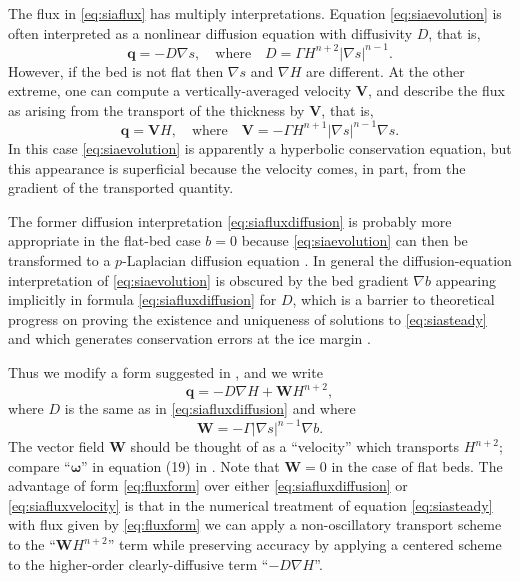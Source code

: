 \documentclass[twocolumn]{igs}
\newcommand\bq{\mathbf{q}}
\newcommand\bV{\mathbf{V}}
\newcommand\bW{\mathbf{W}}
\newcommand{\grad}{\nabla}
\begin{document}
The flux in \eqref{eq:siaflux} has multiply interpretations.  Equation \eqref{eq:siaevolution} is often interpreted as a nonlinear diffusion equation with diffusivity $D$, that is,
\begin{equation}
\bq = - D \grad s, \quad \text{where} \quad D =  \Gamma H^{n+2} |\grad s|^{n-1}. \label{eq:siafluxdiffusion}
\end{equation}
However, if the bed is not flat then $\grad s$ and $\grad H$ are different.  At the other extreme, one can compute a vertically-averaged velocity $\bV$, and describe the flux as arising from the transport of the thickness by $\bV$, that is,
\begin{equation}
\bq = \bV H, \quad \text{where} \quad \bV = - \Gamma H^{n+1} |\grad s|^{n-1} \grad s. \label{eq:siafluxvelocity}
\end{equation}
In this case \eqref{eq:siaevolution} is apparently a hyperbolic conservation equation, but this appearance is superficial because the velocity comes, in part, from the gradient of the transported quantity.

The former diffusion interpretation \eqref{eq:siafluxdiffusion} is probably more appropriate in the flat-bed case $b=0$ because \eqref{eq:siaevolution} can then be transformed to a $p$-Laplacian diffusion equation \cite{CDDSV}.  In general the diffusion-equation interpretation of \eqref{eq:siaevolution} is obscured by the bed gradient $\grad b$ appearing implicitly in formula \eqref{eq:siafluxdiffusion} for $D$, which is a barrier to theoretical progress on proving the existence and uniqueness of solutions to \eqref{eq:siasteady} \citep{JouvetBueler2012} and which generates conservation errors at the ice margin \citep{JaroschSchoofAnslow2013}.

Thus we modify a form suggested in \citep{JaroschSchoofAnslow2013}, and we write
\begin{equation}
\bq = - D \grad H + \bW H^{n+2},\label{eq:fluxform}
\end{equation}
where $D$ is the same as in \eqref{eq:siafluxdiffusion} and where
\begin{equation}
\bW = - \Gamma |\grad s|^{n-1} \grad b.  \label{eq:siaWdefine}
\end{equation}
The vector field $\bW$ should be thought of as a ``velocity'' which transports $H^{n+2}$; compare ``$\boldsymbol{\omega}$'' in equation (19) in \citep{JaroschSchoofAnslow2013}.  Note that $\bW=0$ in the case of flat beds.  The advantage of form \eqref{eq:fluxform} over either \eqref{eq:siafluxdiffusion} or \eqref{eq:siafluxvelocity} is that in the numerical treatment of equation \eqref{eq:siasteady} with flux given by \eqref{eq:fluxform} we can apply a non-oscillatory transport scheme to the ``$\bW H^{n+2}$'' term while preserving accuracy by applying a centered scheme to the higher-order clearly-diffusive term ``$-D \grad H$''.
\end{document}
